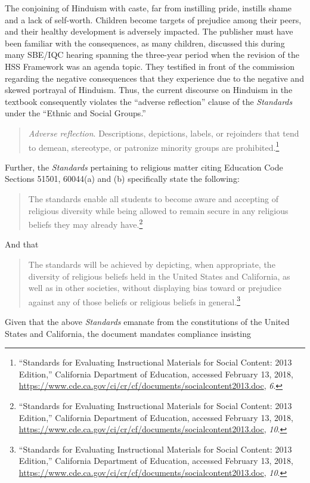 The conjoining of Hinduism with caste, far from instilling pride, instills shame and a lack of self-worth. Children become targets of prejudice among their peers, and their healthy development is adversely impacted. The publisher must have been familiar with the consequences, as many children, discussed this during many SBE/IQC hearing spanning the three-year period when the revision of the HSS Framework was an agenda topic. They testified in front of the commission regarding the negative consequences that they experience due to the negative and skewed portrayal of Hinduism. Thus, the current discourse on Hinduism in the textbook consequently violates the “adverse reflection” clause of the \textit{Standards} under the “Ethnic and Social Groups.”
\begin{quote}
\textit{Adverse reflection}. Descriptions, depictions, labels, or rejoinders that tend to demean, stereotype, or patronize minority groups are prohibited.\footnote{“Standards for Evaluating Instructional Materials for Social Content: 2013 Edition,” California Department of Education, accessed February 13, 2018, \url{https://www.cde.ca.gov/ci/cr/cf/documents/socialcontent2013.doc}, \textit{6}.}
\end{quote}
Further, the \textit{Standards} pertaining to religious matter citing Education Code Sections 51501, 60044(a) and (b) specifically state the following:
\begin{quote}
The standards enable all students to become aware and accepting of religious diversity while being allowed to remain secure in any religious beliefs they may already have.\footnote{“Standards for Evaluating Instructional Materials for Social Content: 2013 Edition,” California Department of Education, accessed February 13, 2018, \url{https://www.cde.ca.gov/ci/cr/cf/documents/socialcontent2013.doc}, \textit{10}.}
\end{quote}
And that
\begin{quote}
The standards will be achieved by depicting, when appropriate, the diversity of religious beliefs held in the United States and California, as well as in other societies, without displaying bias toward or prejudice against any of those beliefs or religious beliefs in general.\footnote{“Standards for Evaluating Instructional Materials for Social Content: 2013 Edition,” California Department of Education, accessed February 13, 2018, \url{https://www.cde.ca.gov/ci/cr/cf/documents/socialcontent2013.doc}, \textit{10}.}
\end{quote}
Given that the above \textit{Standards} emanate from the constitutions of the United States and California, the document mandates compliance insisting
